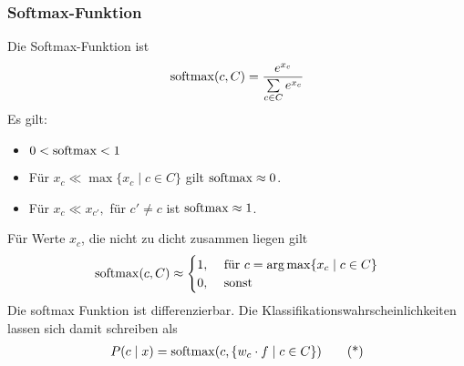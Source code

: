 \subsubsection{Softmax-Funktion}
\label{ssub:softmax_funktion}
Die Softmax-Funktion ist
\begin{align*}
    \operatorname*{softmax}(c,C)= \frac{e^{x_c}}{\sum\limits_{c\in C}e^{x_c}}
\end{align*}
Es gilt: \label{par:es_gilt_}
\begin{itemize}
	\item $0 < \operatorname*{softmax} < 1$
	\item Für $x_c \ll \max\{x_c\mid c\in C\}$ gilt $\operatorname*{softmax} \approx 0$.
	\item Für $x_c \ll x_{c'},$ für $c' \neq c$ ist $\operatorname*{softmax} \approx 1$.
\end{itemize}
Für Werte \(x_c\), die nicht zu dicht zusammen liegen gilt
\begin{align*}
\operatorname*{softmax}(c,C)
\approx \begin{cases}1,& \text{ für }c=\operatorname*{arg\,max}\{x_c\mid c\in C\}\\
0, & \text{ sonst }\end{cases}
\end{align*}
Die softmax Funktion ist differenzierbar.
Die Klassifikationswahrscheinlichkeiten lassen sich damit schreiben als
\begin{align*}
    P(c\mid x)=\operatorname*{softmax}(c,\{w_c\cdot f \mid c\in C\})
    \tag{*}\label{eq:softmax}
\end{align*}


